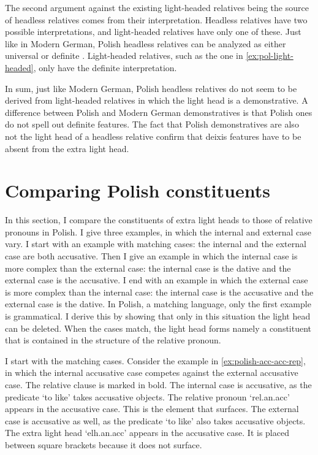The second argument against the existing light-headed relatives being the source of headless relatives comes from their interpretation. Headless relatives have two possible interpretations, and light-headed relatives have only one of these.
Just like in Modern German, Polish headless relatives can be analyzed as either universal or definite .
Light-headed relatives, such as the one in \ref{ex:pol-light-headed}, only have the definite interpretation.

In sum, just like Modern German, Polish headless relatives do not seem to be derived from light-headed relatives in which the light head is a demonstrative. A difference between Polish and Modern German demonstratives is that Polish ones do not spell out definite features. The fact that Polish demonstratives are also not the light head of a headless relative confirm that deixis features have to be absent from the extra light head.



\section{Comparing Polish constituents}\label{sec:comparing-polish}

In this section, I compare the constituents of extra light heads to those of relative pronouns in Polish. I give three examples, in which the internal and external case vary.
I start with an example with matching cases: the internal and the external case are both accusative.
Then I give an example in which the internal case is more complex than the external case: the internal case is the dative and the external case is the accusative.
I end with an example in which the external case is more complex than the internal case: the internal case is the accusative and the external case is the dative.
In Polish, a matching language, only the first example is grammatical. I derive this by showing that only in this situation the light head can be deleted. When the cases match, the light head forms namely a constituent that is contained in the structure of the relative pronoun.

I start with the matching cases.
Consider the example in \ref{ex:polish-acc-acc-rep}, in which the internal accusative case competes against the external accusative case. The relative clause is marked in bold.
The internal case is accusative, as the predicate  `to like' takes accusative objects. The relative pronoun  `\ac{rel}.\ac{an}.\ac{acc}' appears in the accusative case. This is the element that surfaces.
The external case is accusative as well, as the predicate  `to like' also takes accusative objects. The extra light head  `\ac{elh}.\ac{an}.\ac{acc}' appears in the accusative case. It is placed between square brackets because it does not surface.


